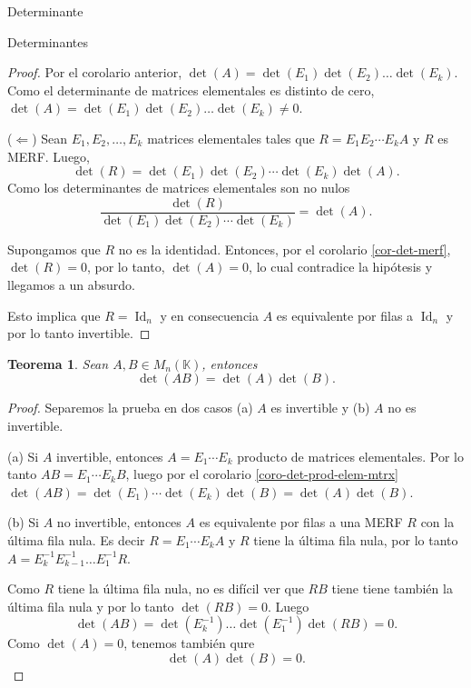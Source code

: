 \documentclass[a4paper,12pt,twoside,spanish,reqno]{amsbook}
\newtheorem{teorema}{Teorema}[section]
\theoremstyle{definition}
\theoremstyle{remark}
\newcommand{\Id}{\operatorname{Id}}
\newcommand{\K}{\mathbb K}
\begin{document}
\begin{chapter}{Determinante}
\begin{section}{Determinantes}
\begin{proof}
            Por el corolario anterior,  $\det(A) = \det(E_1) \det(E_2) \ldots \det(E_k)$. Como el determinante de matrices elementales es distinto de cero, $\det(A) = \det(E_1) \det(E_2) \ldots \det(E_k)\ne 0$.
    
            ($\Leftarrow$) Sean $E_1, E_2, \ldots, E_k$ matrices elementales tales que $R = E_1 E_2 \cdots E_k A$ y $R$ es MERF. Luego,
            \begin{equation*}
                \det(R) = \det(E_1) \det(E_2) \cdots \det(E_k) \det(A). 
            \end{equation*}
            Como los determinantes de matrices  elementales son no nulos
    \begin{equation*}
        \frac{\det(R)}{\det(E_1) \det(E_2) \cdots \det(E_k) } = \det(A). \tag{*}
    \end{equation*}

    
    Supongamos que $R$ no es la identidad.  Entonces, por el corolario \ref{cor-det-merf}, $\det(R) =0$,  por lo tanto, $\det(A)=0$, lo cual contradice la hipótesis y llegamos a un absurdo. 

    Esto implica que  $R= \Id_n$ y en consecuencia  $A$ es equivalente por filas a $\Id_n$ y por lo tanto  invertible.
        \end{proof}
         
    
         \begin{teorema}\label{th-dem-detAB}  Sean $A,B \in M_n(\K)$,  entonces
        $$\det (A B) = \det(A)\det(B).$$
         \end{teorema}
         \begin{proof} 	Separemos la prueba en dos casos (a) $A$ es invertible  y (b) $A$ no es invertible.

            (a) Si $A$ invertible, entonces $A= E_1\cdots E_k$ producto de matrices elementales. Por lo tanto  $AB =  E_1\cdots E_kB$, luego por el corolario \ref{coro-det-prod-elem-mtrx}  $\det(AB) =  \det(E_1)\cdots \det(E_k)\det(B) = \det(A)\det(B)$. 
            
            (b) Si $A$ no invertible,  entonces $A$  es equivalente por filas a una MERF $R$ con la última fila nula. Es decir $R =E_1\cdots E_kA$ y $R$ tiene la última fila nula, por  lo tanto $A=  E_k^{-1}E_{k-1}^{-1}\ldots E_1^{-1}R$. 
            
            Como $R$ tiene la última fila nula, no es difícil ver que  $RB$ tiene tiene también la última fila nula y por lo tanto $\det(RB)=0$. Luego 
             $$
             \det(AB) = \det( E_k^{-1}) \ldots \det(E_1^{-1})\det(RB) =0.
             $$
             Como  $\det(A)=0$, tenemos también qure 
             $$
             \det(A)\det(B) =0.
             $$  
         \end{proof}
         

\end{section}
\end{chapter}
\end{document}

